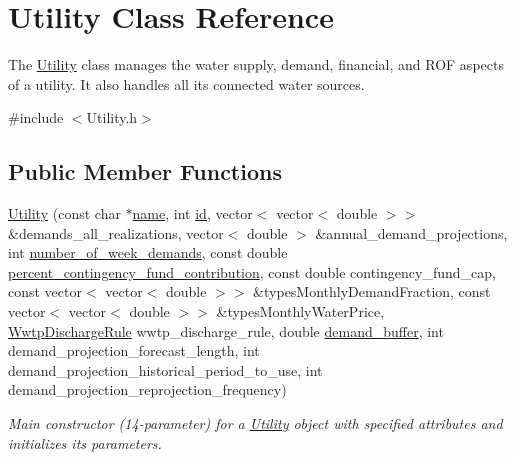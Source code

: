 \hypertarget{classUtility}{}\section{Utility Class Reference}
\label{classUtility}


The {\ttfamily \mbox{\hyperlink{classUtility}{Utility}}} class manages the water supply, demand, financial, and R\+OF aspects of a utility. It also handles all its connected water sources.  




{\ttfamily \#include $<$Utility.\+h$>$}

\subsection*{Public Member Functions}
\begin{DoxyCompactItemize}
\item 
\mbox{\hyperlink{classUtility_a53fb19e5a344de5892c5cfbcc1225da9}{Utility}} (const char $\ast$\mbox{\hyperlink{classUtility_ad0ce5c179a7f5ceb46d4fcae08dbfb47}{name}}, int \mbox{\hyperlink{classUtility_ad41c4ea5c911c5000452a3371cd65d5f}{id}}, vector$<$ vector$<$ double $>$$>$ \&demands\+\_\+all\+\_\+realizations, vector$<$ double $>$ \&annual\+\_\+demand\+\_\+projections, int \mbox{\hyperlink{classUtility_a0548db3746582251082aa430db49dad0}{number\+\_\+of\+\_\+week\+\_\+demands}}, const double \mbox{\hyperlink{classUtility_a7b1a097ec188be8e7175d058b5e6596c}{percent\+\_\+contingency\+\_\+fund\+\_\+contribution}}, const double contingency\+\_\+fund\+\_\+cap, const vector$<$ vector$<$ double $>$$>$ \&types\+Monthly\+Demand\+Fraction, const vector$<$ vector$<$ double $>$$>$ \&types\+Monthly\+Water\+Price, \mbox{\hyperlink{classWwtpDischargeRule}{Wwtp\+Discharge\+Rule}} wwtp\+\_\+discharge\+\_\+rule, double \mbox{\hyperlink{classUtility_a4be9760339ec06e5c932890da8e566b3}{demand\+\_\+buffer}}, int demand\+\_\+projection\+\_\+forecast\+\_\+length, int demand\+\_\+projection\+\_\+historical\+\_\+period\+\_\+to\+\_\+use, int demand\+\_\+projection\+\_\+reprojection\+\_\+frequency)
\begin{DoxyCompactList}\small\item\em Main constructor (14-\/parameter) for a \mbox{\hyperlink{classUtility}{Utility}} object with specified attributes and initializes its parameters. \end{DoxyCompactList}\item 
$$
\end{DoxyCompactItemize}
